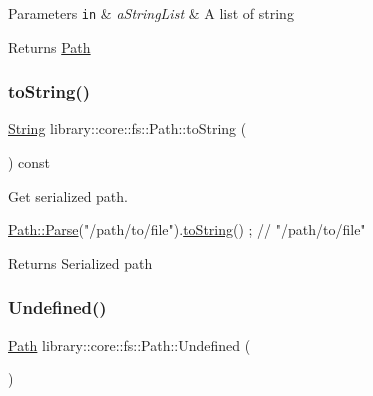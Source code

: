 \begin{DoxyParams}[1]{Parameters}
\mbox{\tt in}  & {\em a\+String\+List} & A list of string \\
\hline
\end{DoxyParams}
\begin{DoxyReturn}{Returns}
\hyperlink{classlibrary_1_1core_1_1fs_1_1_path}{Path} 
\end{DoxyReturn}
\mbox{\label{classlibrary_1_1core_1_1fs_1_1_path_a6f78df53d8e604dd9e1b43e23311724a}} 
\subsubsection{\texorpdfstring{to\+String()}{toString()}}
{\footnotesize\ttfamily \hyperlink{classlibrary_1_1core_1_1types_1_1_string}{String} library\+::core\+::fs\+::\+Path\+::to\+String (\begin{DoxyParamCaption}{ }\end{DoxyParamCaption}) const}



Get serialized path. 


\begin{DoxyCode}
\hyperlink{classlibrary_1_1core_1_1fs_1_1_path_a6ba644b6609507e724c217bf2020f5ae}{Path::Parse}(\textcolor{stringliteral}{"/path/to/file"}).\hyperlink{classlibrary_1_1core_1_1fs_1_1_path_a6f78df53d8e604dd9e1b43e23311724a}{toString}() ; \textcolor{comment}{// "/path/to/file"}
\end{DoxyCode}


\begin{DoxyReturn}{Returns}
Serialized path 
\end{DoxyReturn}
\mbox{\label{classlibrary_1_1core_1_1fs_1_1_path_a0bb46bc56bc1bb180b114bae32477e06}} 
\subsubsection{\texorpdfstring{Undefined()}{Undefined()}}
{\footnotesize\ttfamily \hyperlink{classlibrary_1_1core_1_1fs_1_1_path}{Path} library\+::core\+::fs\+::\+Path\+::\+Undefined (\begin{DoxyParamCaption}{ }\end{DoxyParamCaption})\hspace{0.3cm}{\ttfamily [static]}}



